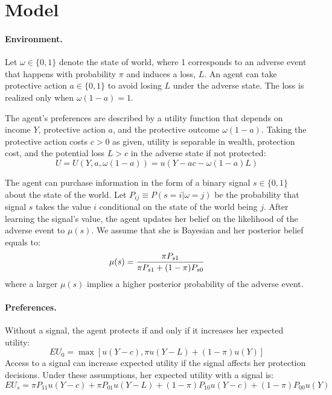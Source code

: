 \documentclass[12pt,a4paper]{article}
\begin{document}
\vspace{20pt}
\section{Model}\label{sec:model}
\paragraph{Environment.} Let $\omega \in \{0,1\}$ denote the state of world, where 1 corresponds to an adverse event that happens with probability $\pi$ and induces a loss, $L$. An agent can take protective action $a\in\{0,1\}$ to avoid losing $L$ under the adverse state. The loss is realized only when $\omega(1-a)=1$.

The agent's preferences are described by a utility function that depends on income $Y$, protective action $a$, and the protective outcome $\omega(1-a)$. Taking the protective action costs $c>0$ as given, utility is separable in wealth, protection cost, and the potential loss $L>c$ in the adverse state if not protected:
\[
U=U(Y,a,\omega(1-a))=u(Y-ac-\omega(1-a)L)
\]

The agent can purchase information in the form of a binary signal $s\in\{0,1\}$ about the state of the world. Let $P_{ij}\equiv P(s=i|\omega=j)$ be the probability that signal $s$ takes the value $i$ conditional on the state of the world being $j$.  After learning the signal's value, the agent updates her belief on the likelihood of the adverse event to $\mu(s)$. We assume that she is Bayesian and her posterior belief equals to:
\[
\mu(s)= {\pi P_{s1} \over \pi P_{s1}+(1-\pi)P_{s0}}
\]
where a larger $\mu(s)$ implies a higher posterior probability of the adverse event.

\vspace{10pt}
\paragraph{Preferences.} Without a signal, the agent protects if and only if it increases her expected utility:
\[
EU_0=\max[u(Y-c),\pi u(Y-L)+(1-\pi) u(Y)]
\]
Access to a signal can increase expected utility if the signal affects her protection decisions. Under these assumptions, her expected utility with a signal is:
\[
EU_s=\pi P_{11}u(Y-c)+\pi P_{01}u(Y-L)+(1-\pi)P_{10}u(Y-c)+(1-\pi)P_{00}u(Y)
\]
\end{document}
